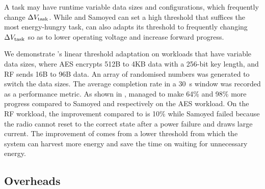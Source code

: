 

A task may have runtime variable data sizes and configurations, which frequently change $\Delta V_{\text{task}}$.
While \debs{} and Samoyed can set a high threshold that suffices the most energy-hungry task, \nn can also adapts its threshold to frequently changing $\Delta V_{\text{task}}$ so as to lower operating voltage and increase forward progress.

We demonstrate \nn{}'s linear threshold adaptation on workloads that have variable data sizes, where AES encrypts 512B to 4KB data with a 256-bit key length, and RF sends 16B to 96B data. 
An array of randomised numbers was generated to switch the data sizes. 
The average completion rate in a \SI{30}{\second} window was recorded as a performance metric.
As shown in , \nn{} managed to make 64\% and 98\% more progress compared to Samoyed and \debs{} respectively on the AES workload. On the RF workload, the improvement compared to \debs{} is 10\% while Samoyed failed because the radio cannot reset to the correct state after a power failure and draws large current. 
The improvement of \nn{} comes from a lower threshold from which the system can harvest more energy and save the time on waiting for unnecessary energy. 

\subsection{Overheads}




